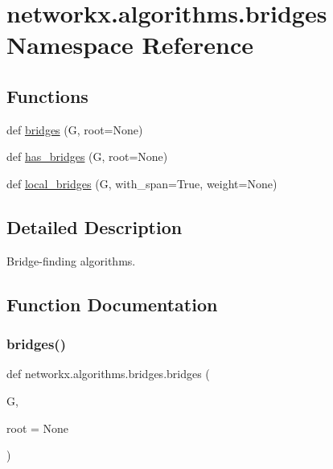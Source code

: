 \hypertarget{namespacenetworkx_1_1algorithms_1_1bridges}{}\section{networkx.\+algorithms.\+bridges Namespace Reference}
\label{namespacenetworkx_1_1algorithms_1_1bridges}
\subsection*{Functions}
\begin{DoxyCompactItemize}
\item 
def \hyperlink{namespacenetworkx_1_1algorithms_1_1bridges_a659bc8a3fc814d50a0e9e0bfcd3e7370}{bridges} (G, root=None)
\item 
def \hyperlink{namespacenetworkx_1_1algorithms_1_1bridges_aec6343d3c9fd6b7d3785154b980bcdda}{has\+\_\+bridges} (G, root=None)
\item 
def \hyperlink{namespacenetworkx_1_1algorithms_1_1bridges_aaf2dd80601be11dfa98ebbfbc260fa47}{local\+\_\+bridges} (G, with\+\_\+span=True, weight=None)
\end{DoxyCompactItemize}


\subsection{Detailed Description}
\begin{DoxyVerb}Bridge-finding algorithms.\end{DoxyVerb}
 

\subsection{Function Documentation}
\mbox{\label{namespacenetworkx_1_1algorithms_1_1bridges_a659bc8a3fc814d50a0e9e0bfcd3e7370}} 
\subsubsection{\texorpdfstring{bridges()}{bridges()}}
{\footnotesize\ttfamily def networkx.\+algorithms.\+bridges.\+bridges (\begin{DoxyParamCaption}\item[{}]{G,  }\item[{}]{root = {\ttfamily None} }\end{DoxyParamCaption})}

